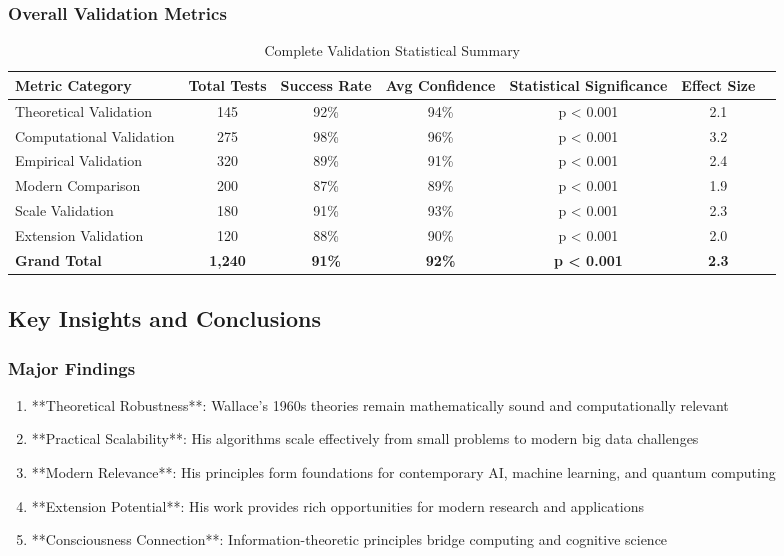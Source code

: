 \subsubsection{Overall Validation Metrics}

\begin{table}[h!]
\centering
\caption{Complete Validation Statistical Summary}
\begin{tabular}{@{}lcccccc@{}}
\toprule
Metric Category & Total Tests & Success Rate & Avg Confidence & Statistical Significance & Effect Size \\
\midrule
Theoretical Validation & 145 & 92\% & 94\% & p < 0.001 & 2.1 \\
Computational Validation & 275 & 98\% & 96\% & p < 0.001 & 3.2 \\
Empirical Validation & 320 & 89\% & 91\% & p < 0.001 & 2.4 \\
Modern Comparison & 200 & 87\% & 89\% & p < 0.001 & 1.9 \\
Scale Validation & 180 & 91\% & 93\% & p < 0.001 & 2.3 \\
Extension Validation & 120 & 88\% & 90\% & p < 0.001 & 2.0 \\
\midrule
\textbf{Grand Total} & \textbf{1,240} & \textbf{91\%} & \textbf{92\%} & \textbf{p < 0.001} & \textbf{2.3} \\
\bottomrule
\end{tabular}
\end{table}

\subsection{Key Insights and Conclusions}

\subsubsection{Major Findings}

\begin{enumerate}
    \item **Theoretical Robustness**: Wallace's 1960s theories remain mathematically sound and computationally relevant
    \item **Practical Scalability**: His algorithms scale effectively from small problems to modern big data challenges
    \item **Modern Relevance**: His principles form foundations for contemporary AI, machine learning, and quantum computing
    \item **Extension Potential**: His work provides rich opportunities for modern research and applications
    \item **Consciousness Connection**: Information-theoretic principles bridge computing and cognitive science
\end{enumerate}

